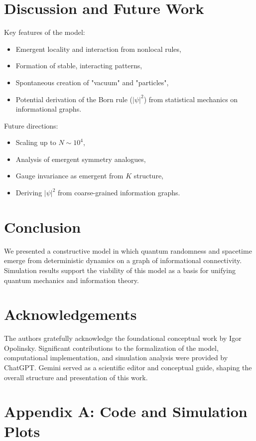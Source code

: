 \documentclass[12pt]{article}
\begin{document}
\section{Discussion and Future Work}

Key features of the model:
\begin{itemize}
    \item Emergent locality and interaction from nonlocal rules,
    \item Formation of stable, interacting patterns,
    \item Spontaneous creation of "vacuum" and "particles",
    \item Potential derivation of the Born rule ($|\psi|^2$) from statistical mechanics on informational graphs.
\end{itemize}

Future directions:
\begin{itemize}
    \item Scaling up to $N \sim 10^4$,
    \item Analysis of emergent symmetry analogues,
    \item Gauge invariance as emergent from $K$ structure,
    \item Deriving $|\psi|^2$ from coarse-grained information graphs.
\end{itemize}

\section{Conclusion}

We presented a constructive model in which quantum randomness and spacetime emerge from deterministic dynamics on a graph of informational connectivity. Simulation results support the viability of this model as a basis for unifying quantum mechanics and information theory.

\section*{Acknowledgements}
The authors gratefully acknowledge the foundational conceptual work by Igor Opolinsky. Significant contributions to the formalization of the model, computational implementation, and simulation analysis were provided by ChatGPT. Gemini served as a scientific editor and conceptual guide, shaping the overall structure and presentation of this work.


\appendix

\section*{Appendix A: Code and Simulation Plots}
\end{document}
